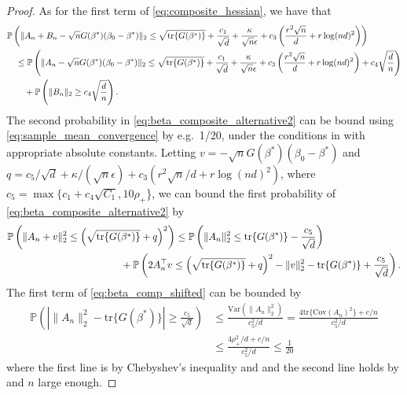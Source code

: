 \documentclass[11pt]{article}
\begin{document}
\begin{proof}
As for the first term of \eqref{eq:composite_hessian}, we have that 
\begin{align}
     &\mathbb{P} \left(\|A_n + B_n - \sqrt{n} G(\beta^*)(\beta_0 - \beta^*)\|_2 \leq \sqrt{\mathrm{tr}\{G(\beta^*)\}} + \frac{c_1}{\sqrt{d}} + \frac{\kappa}{\sqrt{n} \epsilon}+ c_3 \left(\frac{r^2 \sqrt{n}}{d} + r \log(nd)^2 \right) \right) \notag\\
    & \quad\leq \mathbb{P} \left(\|A_n - \sqrt{n} G(\beta^*)(\beta_0 - \beta^*)\|_2 \leq \sqrt{\mathrm{tr}\{G(\beta^*)\}} + \frac{c_1}{\sqrt{d}} + \frac{\kappa}{\sqrt{n} \epsilon}+ c_3 \left(\frac{r^2 \sqrt{n}}{d} + r \log(nd)^2 \right) + c_4 \sqrt{\frac{d}{n}} \right) \notag\\
    &\quad \quad+ \mathbb{P}\left(\|B_n\|_2 \geq c_4 \sqrt{\frac{d}{n}} \right). \label{eq:beta_composite_alternative2}
\end{align}
The second probability in \eqref{eq:beta_composite_alternative2} can be bound using \eqref{eq:sample_mean_convergence} by e.g.~1/20, under the conditions in  with appropriate absolute constants. 
Letting $v= -\sqrt{n}G(\beta^*)(\beta_0 - \beta^*)$ and $q= c_5/\sqrt{d} + \kappa/(\sqrt{n} \epsilon)+ c_3\left(r^2 \sqrt{n} /d + r \log(nd)^2 \right)$, where $c_5 = \max\{c_1 + c_4\sqrt{C_1}, 10\rho_+$\}, we can bound the first probability of \eqref{eq:beta_composite_alternative2} by 
\begin{align}
    &\mathbb{P}\left(\|A_n+v\|^2_2 \leq \left(\sqrt{\mathrm{tr}\{G(\beta^*)\}} +q \right)^2 \right) \leq \mathbb{P}\left(\|A_n\|^2_2 \leq \mathrm{tr}\{G(\beta^*)\} - \frac{c_5}{\sqrt{d}} \right) \notag\\
    &\hspace{4cm}+ \mathbb{P} \left( 2A_n^\top v \leq \left(\sqrt{\mathrm{tr}\{G(\beta^*)\}} + q \right)^2 - \|v\|_2^2 -  \mathrm{tr}\{G(\beta^*)\} + \frac{c_5}{\sqrt{d}} \right).
    \label{eq:beta_comp_shifted}
\end{align}
The first term of \eqref{eq:beta_comp_shifted} can be bounded by
\begin{align*}
\mathbb{P} \left(  \left| \|A_n\|^2_2 - \mathrm{tr}\{G(\beta^*)\} \right| \geq \frac{c_5}{\sqrt{d}} \right) &\leq \frac{\mathrm{Var}(\|A_n\|_2^2)}{c_5^2/d} =  \frac{4 \mathrm{tr}\{\mathrm{Cov}(A_n)^2\} + c/n}{c_5^2/d} \\
&\leq \frac{4 \rho_+^2/d + c/n}{c_5^2/d} \leq \frac{1}{20} 
\end{align*}
where the first line is by Chebyshev's inequality and  and the second line holds by  and $n$ large enough. 


\end{proof}
\end{document}
